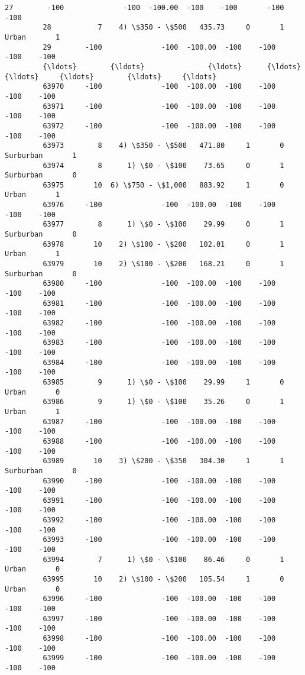 \documentclass[11pt]{article}
\begin{document}
\begin{Verbatim}[commandchars=\\\{\}]
         27        -100              -100  -100.00  -100    -100       -100    -100   
         28           7    4) \$350 - \$500   435.73     0       1      Urban       1   
         29        -100              -100  -100.00  -100    -100       -100    -100   
         {\ldots}        {\ldots}               {\ldots}      {\ldots}   {\ldots}     {\ldots}        {\ldots}     {\ldots}   
         63970     -100              -100  -100.00  -100    -100       -100    -100   
         63971     -100              -100  -100.00  -100    -100       -100    -100   
         63972     -100              -100  -100.00  -100    -100       -100    -100   
         63973        8    4) \$350 - \$500   471.80     1       0  Surburban       1   
         63974        8      1) \$0 - \$100    73.65     0       1  Surburban       0   
         63975       10  6) \$750 - \$1,000   883.92     1       0      Urban       1   
         63976     -100              -100  -100.00  -100    -100       -100    -100   
         63977        8      1) \$0 - \$100    29.99     0       1  Surburban       0   
         63978       10    2) \$100 - \$200   102.01     0       1      Urban       1   
         63979       10    2) \$100 - \$200   168.21     0       1  Surburban       0   
         63980     -100              -100  -100.00  -100    -100       -100    -100   
         63981     -100              -100  -100.00  -100    -100       -100    -100   
         63982     -100              -100  -100.00  -100    -100       -100    -100   
         63983     -100              -100  -100.00  -100    -100       -100    -100   
         63984     -100              -100  -100.00  -100    -100       -100    -100   
         63985        9      1) \$0 - \$100    29.99     1       0      Urban       0   
         63986        9      1) \$0 - \$100    35.26     0       1      Urban       1   
         63987     -100              -100  -100.00  -100    -100       -100    -100   
         63988     -100              -100  -100.00  -100    -100       -100    -100   
         63989       10    3) \$200 - \$350   304.30     1       1  Surburban       0   
         63990     -100              -100  -100.00  -100    -100       -100    -100   
         63991     -100              -100  -100.00  -100    -100       -100    -100   
         63992     -100              -100  -100.00  -100    -100       -100    -100   
         63993     -100              -100  -100.00  -100    -100       -100    -100   
         63994        7      1) \$0 - \$100    86.46     0       1      Urban       0   
         63995       10    2) \$100 - \$200   105.54     1       0      Urban       0   
         63996     -100              -100  -100.00  -100    -100       -100    -100   
         63997     -100              -100  -100.00  -100    -100       -100    -100   
         63998     -100              -100  -100.00  -100    -100       -100    -100   
         63999     -100              -100  -100.00  -100    -100       -100    -100   
         

\end{Verbatim}
\end{document}
